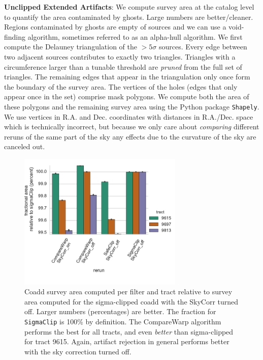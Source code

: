 \documentclass[DM,authoryear,toc]{lsstdoc}
\begin{document}
\textbf{Unclipped Extended Artifacts}:
We compute survey area at the catalog level to quantify the area contaminated by ghosts.
Large numbers are better/cleaner.
Regions contaminated by ghosts are empty of sources and we can use a void-finding algorithm,  sometimes referred to as an alpha-hull algorithm.
We first compute the Delauney triangulation of the  $> 5\sigma$ sources.
Every edge between two adjacent sources contributes to exactly two triangles.
Triangles with a circumference larger than a tunable threshold are \emph{pruned} from the full set of triangles.
The remaining edges that appear in the triangulation only once form the boundary of the  survey area.
The vertices of the holes (edges that only appear once in the set) comprise mask polygons.
We compute both the area of these polygons and the remaining survey area using the Python package \texttt{Shapely}.
We use vertices in R.A. and Dec. coordinates with distances in R.A./Dec. space which is technically incorrect, but because we only care about \emph{comparing} different reruns of the same part of the sky any effects due to the curvature of the sky are canceled out.


\begin{figure}
\begin{centering}
\includegraphics[width=0.7\textwidth]{figures/survey_area.pdf}
\par\end{centering}
\caption{\label{fig:area} Coadd survey area computed per filter and tract relative to survey area computed for the sigma-clipped coadd with the SkyCorr turned off.  Larger numbers (percentages) are better.  The fraction for \texttt{SigmaClip} is 100\% by definition. The CompareWarp algorithm performs the best for all tracts, and even \emph{better} than sigma-clipped for tract 9615.  Again, artifact rejection in general performs better with the sky correction turned off. }
\end{figure}
\end{document}
